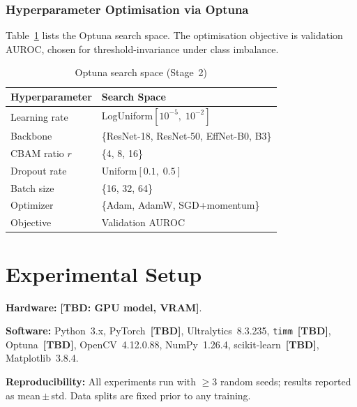 \documentclass[conference]{IEEEtran}
\begin{document}
\subsubsection{Hyperparameter Optimisation via Optuna}

Table~\ref{tab:optuna} lists the Optuna search space.
The optimisation objective is validation AUROC, chosen for
threshold-invariance under class imbalance.

\begin{table}[t]
  \caption{Optuna search space (Stage~2)}
  \label{tab:optuna}
  \begin{center}
  \renewcommand{\arraystretch}{1.05}
  \small
  \begin{tabular}{p{2.4cm}p{4.8cm}}
    \toprule
    \textbf{Hyperparameter} & \textbf{Search Space} \\
    \midrule
    Learning rate & LogUniform$[10^{-5},\;10^{-2}]$ \\
    Backbone & \{ResNet-18, ResNet-50, EffNet-B0, B3\} \\
    CBAM ratio $r$ & \{4, 8, 16\} \\
    Dropout rate & Uniform$[0.1,\;0.5]$ \\
    Batch size & \{16, 32, 64\} \\
    Optimizer & \{Adam, AdamW, SGD+momentum\} \\
    Objective & Validation AUROC \\
    \bottomrule
  \end{tabular}
  \end{center}
\end{table}

\section{Experimental Setup}
\label{sec:setup}

\textbf{Hardware:} \textbf{[TBD: GPU model, VRAM]}.

\textbf{Software:} Python~3.x, PyTorch~\textbf{[TBD]},
Ultralytics~8.3.235, \texttt{timm}~\textbf{[TBD]},
Optuna~\textbf{[TBD]}, OpenCV~4.12.0.88, NumPy~1.26.4,
scikit-learn~\textbf{[TBD]}, Matplotlib~3.8.4.

\textbf{Reproducibility:} All experiments run with $\geq$3
random seeds; results reported as mean\,$\pm$\,std.
Data splits are fixed prior to any training.
\end{document}
